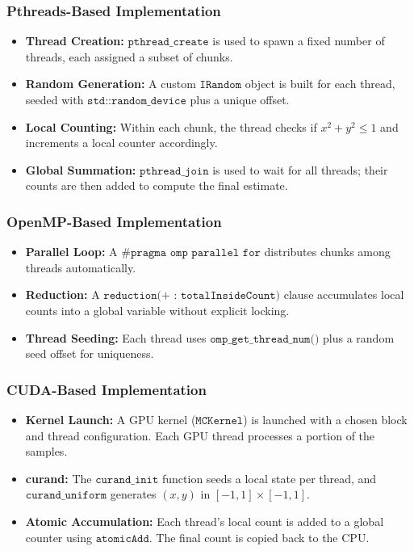 \documentclass[12pt]{article}
\begin{document}
\subsubsection{Pthreads-Based Implementation}
\begin{itemize}
    \item \textbf{Thread Creation:} \(\texttt{pthread\_create}\) is used to spawn a fixed
          number of threads, each assigned a subset of chunks.
    \item \textbf{Random Generation:} A custom \(\texttt{IRandom}\) object is built for
          each thread, seeded with \(\texttt{std::random\_device}\) plus a unique offset.
    \item \textbf{Local Counting:} Within each chunk, the thread checks if
          \(x^2 + y^2 \le 1\) and increments a local counter accordingly.
    \item \textbf{Global Summation:} \(\texttt{pthread\_join}\) is used to wait for all
          threads; their counts are then added to compute the final estimate.
\end{itemize}

\subsubsection{OpenMP-Based Implementation}
\begin{itemize}
    \item \textbf{Parallel Loop:} A \(\texttt{\#pragma omp parallel for}\) distributes
          chunks among threads automatically.
    \item \textbf{Reduction:} A \(\texttt{reduction(+ : totalInsideCount)}\) clause
          accumulates local counts into a global variable without explicit locking.
    \item \textbf{Thread Seeding:} Each thread uses
          \(\texttt{omp\_get\_thread\_num()}\) plus a random seed offset for uniqueness.
\end{itemize}

\subsubsection{CUDA-Based Implementation}
\begin{itemize}
    \item \textbf{Kernel Launch:} A GPU kernel (\(\texttt{MCKernel}\)) is launched with a
          chosen block and thread configuration. Each GPU thread processes a portion of
          the samples.
    \item \textbf{curand:} The \(\texttt{curand\_init}\) function seeds a local state per
          thread, and \(\texttt{curand\_uniform}\) generates \((x,y)\) in
          \([-1,1]\times[-1,1]\).
    \item \textbf{Atomic Accumulation:} Each thread's local count is added to a global
          counter using \(\texttt{atomicAdd}\). The final count is copied back to the CPU.
\end{itemize}
\end{document}
